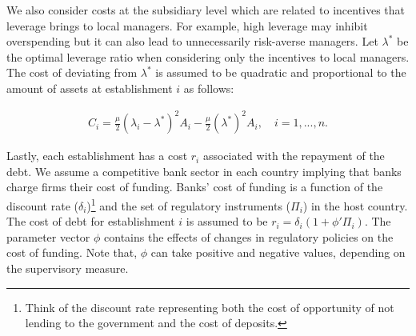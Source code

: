\documentclass[12pt]{article}
\begin{document}
	We also consider costs at the subsidiary level which are related to incentives that leverage brings to local managers. For example, high leverage may inhibit overspending but it can also lead to unnecessarily risk-averse managers. Let $\lambda^*$ be the optimal leverage ratio when considering only the incentives to local managers. The cost of deviating from $\lambda^*$ is assumed to be quadratic and proportional to the amount of assets at establishment $i$ as follows:  
	
	\begin{equation}
	\begin{aligned}
	C_i=\frac{\mu}{2}(\lambda_i-\lambda^*)^2A_i-\frac{\mu}{2}(\lambda^*)^2A_i, \quad i=1,...,n.
	\end{aligned}
	\label{eq:agency cost}
	\end{equation}	
		
	Lastly, each establishment has a cost $r_i$ associated with the repayment of the debt. We assume a competitive bank sector in each country implying that banks charge firms their cost of funding. Banks' cost of funding is a function of the discount rate ($\delta_i$)\footnote{Think of the discount rate representing both the cost of opportunity of not lending to the government and the cost of deposits.}  and the set of regulatory instruments ($\Pi_i$) in the host country. The cost of debt for establishment $i$ is assumed to be $r_i=\delta_i(1+\phi'\Pi_i)$. The parameter vector $\phi$ contains the effects of changes in regulatory policies on the cost of funding. Note that, $\phi$ can take positive and negative values, depending on the supervisory measure.
	
\end{document}

